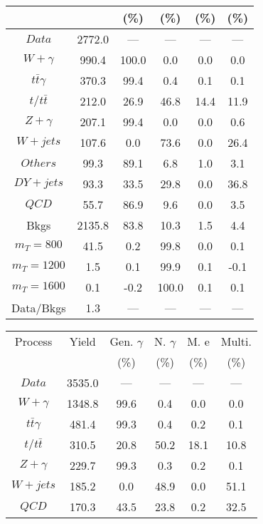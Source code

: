 \begin{figure}
\begin{minipage}[c]{0.32\textwidth}
{\begin{tabular}{cccccc}
 &  & (\%) & (\%) & (\%) & (\%)  \\
\hline
                                                                      $ Data $ &  2772.0 &  --- &  --- &  --- &  ---\\
$ W+\gamma $ &  990.4 &  100.0 &  0.0 &  0.0 &  0.0\\
$ t\bar{t}\gamma $ &  370.3 &  99.4 &  0.4 &  0.1 &  0.1\\
$ t/t\bar{t} $ &  212.0 &  26.9 &  46.8 &  14.4 &  11.9\\
$ Z+\gamma $ &  207.1 &  99.4 &  0.0 &  0.0 &  0.6\\
$ W+jets $ &  107.6 &  0.0 &  73.6 &  0.0 &  26.4\\
$ Others $ &  99.3 &  89.1 &  6.8 &  1.0 &  3.1\\
$ DY+jets $ &  93.3 &  33.5 &  29.8 &  0.0 &  36.8\\
$ QCD $ &  55.7 &  86.9 &  9.6 &  0.0 &  3.5\\
Bkgs &  2135.8 &  83.8 &  10.3 &  1.5 &  4.4\\
$ m_{T} = 800 $ &  41.5 &  0.2 &  99.8 &  0.0 &  0.1\\
$ m_{T} = 1200 $ &  1.5 &  0.1 &  99.9 &  0.1 &  -0.1\\
$ m_{T} = 1600 $ &  0.1 &  -0.2 &  100.0 &  0.1 &  0.1\\
Data/Bkgs &  1.3 &  --- &  --- &  --- &  ---\\
\hline
\end{tabular}
}
\end{minipage}
\begin{minipage}[c]{0.32\textwidth}
\centering
\tiny{
\begin{tabular}{cccccc}
\hline
Process & Yield & Gen. $\gamma$ & N. $\gamma$ & M. e & Multi. \\
 &  & (\%) & (\%) & (\%) & (\%)  \\
\hline
                                                                      $ Data $ &  3535.0 &  --- &  --- &  --- &  ---\\
$ W+\gamma $ &  1348.8 &  99.6 &  0.4 &  0.0 &  0.0\\
$ t\bar{t}\gamma $ &  481.4 &  99.3 &  0.4 &  0.2 &  0.1\\
$ t/t\bar{t} $ &  310.5 &  20.8 &  50.2 &  18.1 &  10.8\\
$ Z+\gamma $ &  229.7 &  99.3 &  0.3 &  0.2 &  0.1\\
$ W+jets $ &  185.2 &  0.0 &  48.9 &  0.0 &  51.1\\
$ QCD $ &  170.3 &  43.5 &  23.8 &  0.2 &  32.5\\

\end{tabular}}
\end{minipage}
\end{figure}
